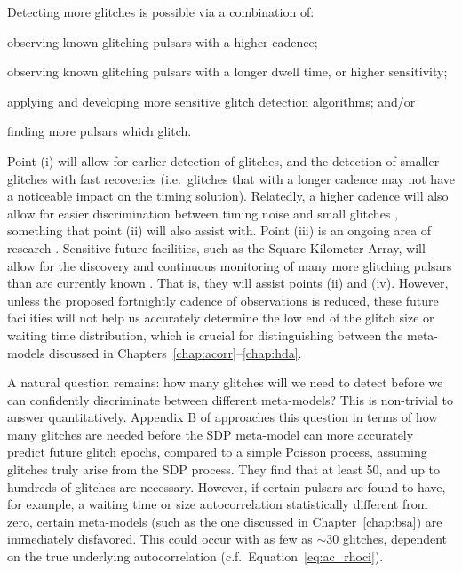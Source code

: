 Detecting more glitches is possible via a combination of: \begin{enumerate*}
\item observing known glitching pulsars with a higher cadence;
\item observing known glitching pulsars with a longer dwell time, or higher sensitivity;
\item applying and developing more sensitive glitch detection algorithms; and/or
\item finding more pulsars which glitch.
\end{enumerate*}
Point (i) will allow for earlier detection of glitches, and the detection of smaller glitches with fast recoveries (i.e.~glitches that with a longer cadence may not have a noticeable impact on the timing solution). Relatedly, a higher cadence will also allow for easier discrimination between timing noise and small glitches \citep{Melatos2020hmm, Dunn2022}, something that point (ii) will also assist with. Point (iii) is an ongoing area of research \citep{Lentati2014,Melatos2020hmm,Singha2021a}. Sensitive future facilities, such as the Square Kilometer Array, will allow for the discovery and continuous monitoring of many more glitching pulsars than are currently known \citep{Watts2015, Singha2022}. That is, they will assist points (ii) and (iv). However, unless the proposed fortnightly cadence of observations is reduced, these future facilities will not help us accurately determine the low end of the glitch size or waiting time distribution, which is crucial for distinguishing between the meta-models discussed in Chapters~\ref{chap:acorr}--\ref{chap:hda}. 

A natural question remains: how many glitches will we need to detect before we can confidently discriminate between different meta-models? This is non-trivial to answer quantitatively. Appendix B of \citet{Melatos2019} approaches this question in terms of how many glitches are needed before the SDP meta-model can more accurately predict future glitch epochs, compared to a simple Poisson process, assuming glitches truly arise from the SDP process. They find that at least 50, and up to hundreds of glitches are necessary. However, if certain pulsars are found to have, for example, a waiting time or size autocorrelation statistically different from zero, certain meta-models (such as the one discussed in Chapter~\ref{chap:bsa}) are immediately disfavored. This could occur with as few as $\sim30$ glitches, dependent on the true underlying autocorrelation (c.f.~Equation~\eqref{eq:ac_rhoci}). 

